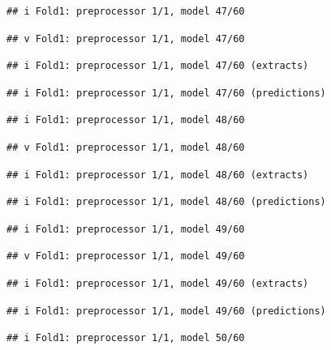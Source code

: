 \documentclass[
]{article}
\begin{document}
\begin{verbatim}
## i Fold1: preprocessor 1/1, model 47/60
\end{verbatim}

\begin{verbatim}
## v Fold1: preprocessor 1/1, model 47/60
\end{verbatim}

\begin{verbatim}
## i Fold1: preprocessor 1/1, model 47/60 (extracts)
\end{verbatim}

\begin{verbatim}
## i Fold1: preprocessor 1/1, model 47/60 (predictions)
\end{verbatim}

\begin{verbatim}
## i Fold1: preprocessor 1/1, model 48/60
\end{verbatim}

\begin{verbatim}
## v Fold1: preprocessor 1/1, model 48/60
\end{verbatim}

\begin{verbatim}
## i Fold1: preprocessor 1/1, model 48/60 (extracts)
\end{verbatim}

\begin{verbatim}
## i Fold1: preprocessor 1/1, model 48/60 (predictions)
\end{verbatim}

\begin{verbatim}
## i Fold1: preprocessor 1/1, model 49/60
\end{verbatim}

\begin{verbatim}
## v Fold1: preprocessor 1/1, model 49/60
\end{verbatim}

\begin{verbatim}
## i Fold1: preprocessor 1/1, model 49/60 (extracts)
\end{verbatim}

\begin{verbatim}
## i Fold1: preprocessor 1/1, model 49/60 (predictions)
\end{verbatim}

\begin{verbatim}
## i Fold1: preprocessor 1/1, model 50/60
\end{verbatim}
\end{document}
